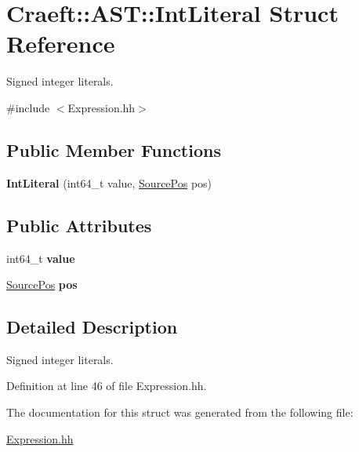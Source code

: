 \hypertarget{struct_craeft_1_1_a_s_t_1_1_int_literal}{}\section{Craeft\+:\+:A\+ST\+:\+:Int\+Literal Struct Reference}
\label{struct_craeft_1_1_a_s_t_1_1_int_literal}


Signed integer literals.  




{\ttfamily \#include $<$Expression.\+hh$>$}

\subsection*{Public Member Functions}
\begin{DoxyCompactItemize}
\item 
\hypertarget{struct_craeft_1_1_a_s_t_1_1_int_literal_a094cc3c63b8b5762312fe0720801c4de}{}\label{struct_craeft_1_1_a_s_t_1_1_int_literal_a094cc3c63b8b5762312fe0720801c4de} 
{\bfseries Int\+Literal} (int64\+\_\+t value, \hyperlink{struct_craeft_1_1_source_pos}{Source\+Pos} pos)
\end{DoxyCompactItemize}
\subsection*{Public Attributes}
\begin{DoxyCompactItemize}
\item 
\hypertarget{struct_craeft_1_1_a_s_t_1_1_int_literal_a18d15284860c74ab021c55a498c7bb46}{}\label{struct_craeft_1_1_a_s_t_1_1_int_literal_a18d15284860c74ab021c55a498c7bb46} 
int64\+\_\+t {\bfseries value}
\item 
\hypertarget{struct_craeft_1_1_a_s_t_1_1_int_literal_a350599f201b1277802d2c2d77e39562e}{}\label{struct_craeft_1_1_a_s_t_1_1_int_literal_a350599f201b1277802d2c2d77e39562e} 
\hyperlink{struct_craeft_1_1_source_pos}{Source\+Pos} {\bfseries pos}
\end{DoxyCompactItemize}


\subsection{Detailed Description}
Signed integer literals. 

Definition at line 46 of file Expression.\+hh.



The documentation for this struct was generated from the following file\+:\begin{DoxyCompactItemize}
\item 
\hyperlink{_expression_8hh}{Expression.\+hh}\end{DoxyCompactItemize}
